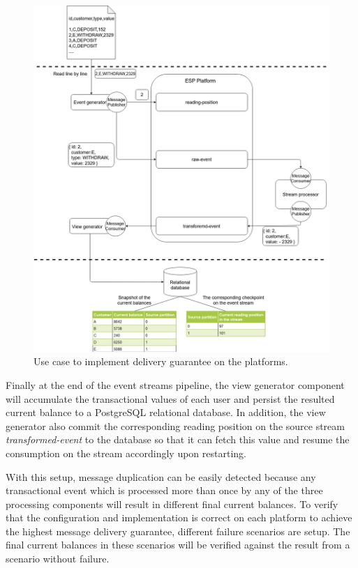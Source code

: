 \begin{figure}
\begin{adjustwidth}{-1cm}{}
	\centering
	\includegraphics[width=18cm,height=\textheight]{images/implementation-use-case-1.png}
	\caption{Use case to implement delivery guarantee on the platforms.}
	\label{fig:impusecase}
\end{adjustwidth}
\end{figure}


Finally at the end of the event streams pipeline, the view generator component will accumulate the transactional values of each user and persist the resulted current balance to a PostgreSQL relational database. In addition, the view generator also commit the corresponding reading position on the source stream \emph{transformed-event} to the database so that it can fetch this value and resume the consumption on the stream accordingly upon restarting.


With this setup, message duplication can be easily detected because any transactional event which is processed more than once by any of the three processing components will result in different final current balances. To verify that the configuration and implementation is correct on each platform to achieve the highest message delivery guarantee, different failure scenarios are setup. The final current balances in these scenarios will be verified against the result from a scenario without failure.


